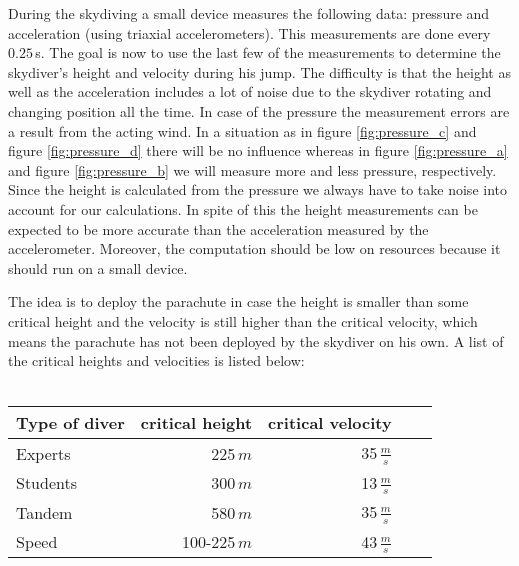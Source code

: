 During the skydiving a small device measures the following data: pressure and acceleration (using triaxial accelerometers). This measurements are done every $0.25$\,s. The goal is now to use the last few of the measurements to determine the skydiver's height and velocity during his jump. The difficulty is that the height as well as the acceleration includes a lot of noise due to the skydiver rotating and changing position all the time. In case of the pressure the measurement errors are a result from the acting wind. In a situation as in figure \ref{fig:pressure_c} and figure \ref{fig:pressure_d} there will be no influence whereas in figure \ref{fig:pressure_a} and figure \ref{fig:pressure_b} we will measure more and less pressure, respectively. Since the height is calculated from the pressure we always have to take noise into account for our calculations. In spite of this the height measurements can be expected to be more accurate than the acceleration measured by the accelerometer. Moreover, the computation should be low on resources because it should run on a small device.

The idea is to deploy the parachute in case the height is smaller than some critical height and the velocity is still higher than the critical velocity, which means the parachute has not been deployed by the skydiver on his own. A list of the critical heights and velocities is listed below:\\
\hfill\\
\begin{tabular}{|l|r|r|r|r|}
\hline
     Type of diver & critical height  & critical velocity\\ \hline
	Experts &  225\,$m$ & 35\,$\frac{m}{s}$  \\ \hline
	Students & 300\,$m$  & 13\,$\frac{m}{s}$ \\ \hline
	Tandem&  580\,$m$  & 35\,$\frac{m}{s}$  \\ \hline
	Speed&  100-225\,$m$  & 43\,$\frac{m}{s}$  \\ \hline
\end{tabular} 
